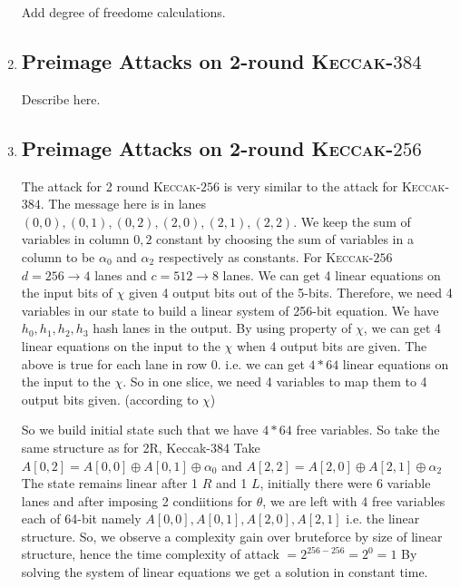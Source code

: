 \documentclass[runningheads]{llncs}
\newcommand{\KECCAK}{\mbox{\textsc{Keccak}}}
\begin{document}
\begin{enumerate}
		Add degree of freedome calculations.

	\item \subsection{Preimage Attacks on 2-round \KECCAK-$384$}
				Describe here.

	\item \subsection{Preimage Attacks on 2-round \KECCAK-$256$}
			The attack for 2 round \KECCAK-$256$ is very similar to the attack for \KECCAK-$384$.
			The message here is in lanes $(0, 0), (0, 1), (0, 2), (2, 0), (2, 1), (2, 2)$.
    	We keep the sum of variables in column $0, 2$ constant by choosing the sum of variables in a column to be $\alpha_0 $ and $\alpha_2$ respectively as constants. For \KECCAK-$256$ $d = 256 \rightarrow 4$ lanes and $c = 512 \rightarrow 8$ lanes. We can get 4 linear equations on the input bits of $\chi$ given 4 output bits out of the 5-bits. Therefore, we need 4 variables in our state to build a linear system of 256-bit equation.	We have $h_0, h_1, h_2, h_3$  hash lanes in the output. By using property of $\chi$, we can get 4 linear equations on the input to the $\chi$ when 4 output bits are given. The above is true for each lane in row 0. i.e. we can get $4*64$ linear equations on the input to the $\chi$. So in one slice, we need 4 variables to map them to 4 output bits given. (according to $\chi$) 
			
			So we build initial state such that we have $4*64$ free variables. So take the same structure as for 2R, Keccak-384
    	Take $A[0, 2] = A[0, 0] \oplus A[0, 1] \oplus \alpha_0$
    	and $A[2, 2] = A[2, 0] \oplus A[2, 1] \oplus \alpha_2$
  		The state remains linear after 1 $R$ and 1 $L$, initially there were 6 variable lanes and after imposing 2 condiitions for $\theta$, we are left with 4 free variables each of 64-bit namely $A[0,0], A[0,1], A[2, 0], A[2,1]$ i.e. the linear structure.
			So, we observe a complexity gain over bruteforce by size of linear structure, hence the time complexity of attack $ = 2^{256 - 256} = 2^{0} = 1$
    	By solving the system of linear equations we get a solution in constant time.
\end{enumerate}
\end{document}
